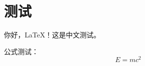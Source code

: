 \documentclass{article}
\begin{document}
\section{测试}
你好，LaTeX！这是中文测试。

公式测试：
\[
E=mc^2
\]
\end{document}
